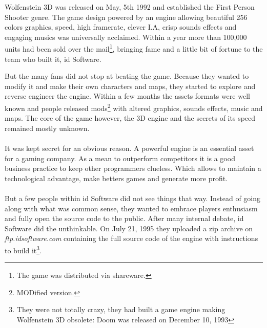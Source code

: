 Wolfenstein 3D was released on May, 5th 1992 and established the First Person Shooter genre. The game design powered by an engine allowing beautiful 256 colors graphics, speed, high framerate, clever I.A, crisp sounds effects and engaging musics was universally acclaimed. Within a year more than 100,000 units had been sold over the mail\footnote{The game was distributed via shareware.}, bringing fame and a little bit of fortune to the team who built it, id Software.\\
\par
\begin{figure}[H]
\centering
{}
\end{figure}
\par
But the many fans did not stop at beating the game. Because they wanted to modify it and make their own characters and maps, they started to explore and reverse engineer the engine. Within a few months the assets formats were well known and people released mods\footnote{MODified version.} with altered graphics, sounds effects, music and maps. The core of the game however, the 3D engine and the secrets of its speed remained mostly unknown.\\
\\
It was kept secret for an obvious reason. A powerful engine is an essential asset for a gaming company. As a mean to outperform competitors it is a good business practice to keep other programmers clueless. Which allows to maintain a technological advantage, make betters games and generate more profit.\\
\\
But a few people within id Software did not see things that way. Instead of going along with what was common sense, they wanted to embrace players enthusiasm and fully open the source code to the public. After many internal debate, id Software did the unthinkable. On July 21, 1995 they uploaded a zip archive on \emph{ftp.idsoftware.com} containing the full source code of the engine with instructions to build it\footnote{They were not totally crazy, they had built a game engine making Wolfenstein 3D obsolete: Doom was released on December 10, 1993}.\\


